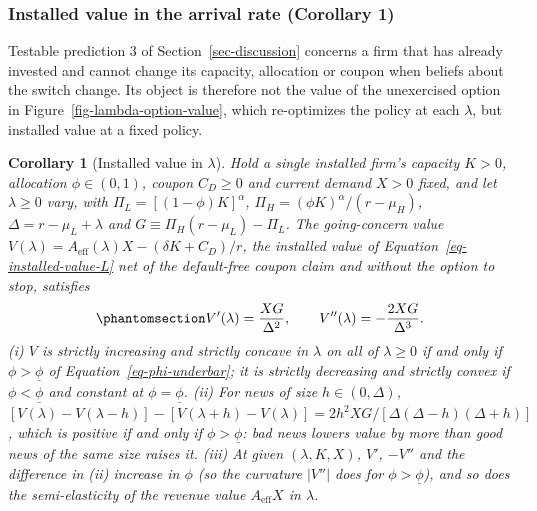 \documentclass[
  11pt,
  letterpaper,
]{scrartcl}
\begin{document}
\subsubsection*{Installed value in the arrival rate (Corollary
1)}\label{installed-value-in-the-arrival-rate-corollary-1}

Testable prediction 3 of Section~\ref{sec-discussion} concerns a firm
that has already invested and cannot change its capacity, allocation or
coupon when beliefs about the switch change. Its object is therefore not
the value of the unexercised option in
Figure~\ref{fig-lambda-option-value}, which re-optimizes the policy at
each \(\lambda\), but installed value at a fixed policy.

\textbf{Corollary 1} (Installed value in \(\lambda\)). \emph{Hold a
single installed firm's capacity \(K > 0\), allocation
\(\phi \in (0, 1)\), coupon \(C_D \geq 0\) and current demand \(X > 0\)
fixed, and let \(\lambda \geq 0\) vary, with
\(\Pi_L = [(1-\phi)K]^\alpha\), \(\Pi_H = (\phi K)^\alpha/(r - \mu_H)\),
\(\Delta = r - \mu_L + \lambda\) and
\(G \equiv \Pi_H (r - \mu_L) - \Pi_L\). The going-concern value
\(V(\lambda) = A_{\text{eff}}(\lambda) X - (\delta K + C_D)/r\), the
installed value of Equation~\ref{eq-installed-value-L} net of the
default-free coupon claim and without the option to stop, satisfies}
\begin{equation}\protect\phantomsection\label{eq-installed-lambda}{
V'(\lambda) = \frac{X G}{\Delta^2}, \qquad V''(\lambda) = -\frac{2 X G}{\Delta^3}.
}\end{equation} \emph{(i) \(V\) is strictly increasing and strictly
concave in \(\lambda\) on all of \(\lambda \geq 0\) if and only if
\(\phi > \underline{\phi}\) of Equation~\ref{eq-phi-underbar}; it is
strictly decreasing and strictly convex if \(\phi < \underline{\phi}\)
and constant at \(\phi = \underline{\phi}\). (ii) For news of size
\(h \in (0, \Delta)\),
\([V(\lambda) - V(\lambda - h)] - [V(\lambda + h) - V(\lambda)] = 2h^2 X G/[\Delta(\Delta - h)(\Delta + h)]\),
which is positive if and only if \(\phi > \underline{\phi}\): bad news
lowers value by more than good news of the same size raises it. (iii) At
given \((\lambda, K, X)\), \(V'\), \(-V''\) and the difference in (ii)
increase in \(\phi\) (so the curvature \(|V''|\) does for
\(\phi > \underline{\phi}\)), and so does the semi-elasticity of the
revenue value \(A_{\text{eff}} X\) in \(\lambda\).}
\end{document}
